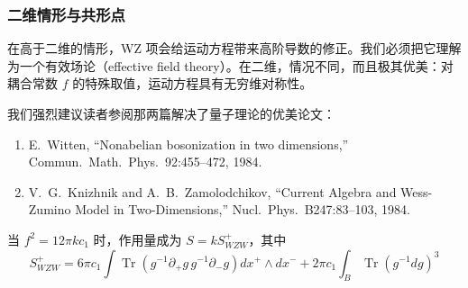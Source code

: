 
\subsubsection{二维情形与共形点} %

在高于二维的情形，WZ 项会给运动方程带来高阶导数的修正。我们必须把它理解为一个有效场论（effective field theory）。在二维，情况不同，而且极其优美：对耦合常数 $f$ 的特殊取值，运动方程具有无穷维对称性。

我们强烈建议读者参阅那两篇解决了量子理论的优美论文：

\begin{enumerate}
  \item E.~Witten, ``Nonabelian bosonization in two dimensions,'' Commun.\ Math.\ Phys.\ 92:455--472, 1984.
  \item V.~G.~Knizhnik and A.~B.~Zamolodchikov, ``Current Algebra and Wess-Zumino Model in Two-Dimensions,'' Nucl.\ Phys.\ B247:83--103, 1984.
\end{enumerate}

当 $f^2=12\pi k c_1$ 时，作用量成为 $S=kS^+_{WZW}$，其中
\begin{equation}
  S^+_{WZW} = 6\pi c_1\int\operatorname{Tr}\left(g^{-1}\partial_+ g\,g^{-1}\partial_- g\right)dx^+\wedge dx^- + 2\pi c_1\int_B\operatorname{Tr}\left(g^{-1}dg\right)^3
  \tag{4.32}
  \label{eq:4.32}
\end{equation}

